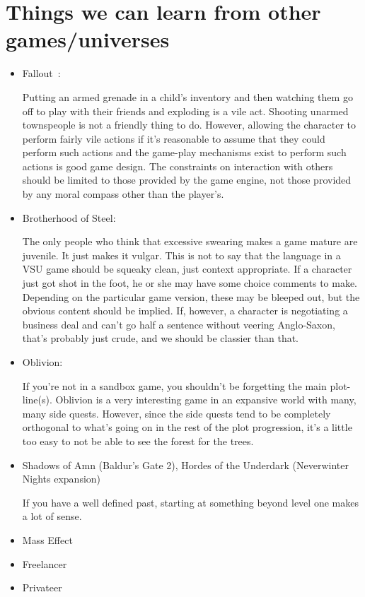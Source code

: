 \section{Things we can learn from other games/universes}

\begin{itemize}
\item Fallout~\cite{FalloutRPG}:

Putting an armed grenade in a child's inventory and then watching them
go off to play with their friends and exploding is a vile
act. Shooting unarmed townspeople is not a friendly thing to
do. However, allowing the character to perform fairly vile actions if
it's reasonable to assume that they could perform such actions and the
game-play mechanisms exist to perform such actions is good game
design. The constraints on interaction with others should be limited
to those provided by the game engine, not those provided by any moral
compass other than the player's.

\item Brotherhood of Steel:

The only people who think that excessive swearing makes a game mature
are juvenile. It just makes it vulgar. This is not to say that the
language in a VSU game should be squeaky clean, just context
appropriate. If a character just got shot in the foot, he or she may
have some choice comments to make. Depending on the particular game
version, these may be bleeped out, but the obvious content should be
implied. If, however, a character is negotiating a business deal and
can't go half a sentence without veering Anglo-Saxon, that's probably
just crude, and we should be classier than that.

\item Oblivion:

If you're not in a sandbox game, you shouldn't be forgetting the main
plot-line(s).  Oblivion is a very interesting game in an expansive
world with many, many side quests. However, since the side quests tend
to be completely orthogonal to what's going on in the rest of the plot
progression, it's a little too easy to not be able to see the forest
for the trees.

\item Shadows of Amn (Baldur's Gate 2), Hordes of the Underdark (Neverwinter Nights expansion)

If you have a well defined past, starting at something beyond level
one makes a lot of sense.

\item Mass Effect

\item Freelancer

\item Privateer

\end{itemize}


